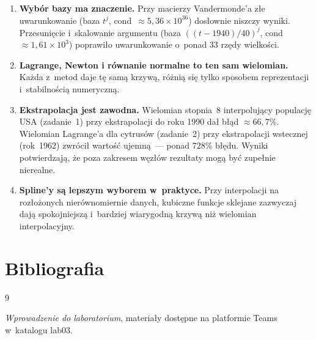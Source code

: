 \documentclass[12pt, a4paper]{article}
\begin{document}
\begin{enumerate}
  \item \textbf{Wybór bazy ma znaczenie.} Przy macierzy Vandermonde'a złe
        uwarunkowanie (baza $t^j$, cond~$\approx 5{,}36 \times 10^{36}$)
        dosłownie niszczy wyniki. Przesunięcie i~skalowanie argumentu
        (baza $((t-1940)/40)^j$, cond~$\approx 1{,}61 \times 10^{3}$)
        poprawiło uwarunkowanie o~ponad 33 rzędy wielkości.

  \item \textbf{Lagrange, Newton i równanie normalne to ten sam wielomian.}
        Każda z~metod daje tę samą krzywą, różnią się tylko sposobem
        reprezentacji i~stabilnością numeryczną.

  \item \textbf{Ekstrapolacja jest zawodna.}
        Wielomian stopnia~8 interpolujący populację USA (zadanie~1)
        przy ekstrapolacji do roku 1990 dał błąd $\approx 66{,}7\%$.
        Wielomian Lagrange'a dla cytrusów (zadanie~2) przy ekstrapolacji
        wstecznej (rok~1962) zwrócił wartość ujemną~--- ponad $728\%$ błędu.
        Wyniki potwierdzają, że poza zakresem węzłów rezultaty mogą być
        zupełnie nierealne.

  \item \textbf{Spline'y są lepszym wyborem w~praktyce.}
        Przy interpolacji na rozłożonych nierównomiernie danych, kubiczne
        funkcje sklejane zazwyczaj dają spokojniejszą i~bardziej
        wiarygodną krzywą niż wielomian interpolacyjny.
\end{enumerate}

\section*{Bibliografia}

\begin{thebibliography}{9}

  \textit{Wprowadzenie do laboratorium}, materia\l{}y dost\k{e}pne
  na platformie Teams w~katalogu lab03.

\end{thebibliography}
\end{document}
